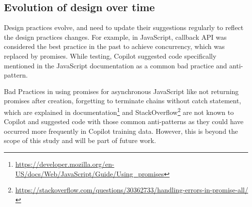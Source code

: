 \subsection{Evolution of design over time}
\label{evolution}
Design practices evolve, and \cct{} need to update their suggestions regularly to reflect the design practices changes. 
For example, in JavaScript, callback API was considered the best practice in the past to achieve concurrency, which was replaced by promises. 
While testing, Copilot suggested code specifically mentioned in the JavaScript documentation as a common bad practice and anti-pattern.

Bad Practices in using promises for asynchronous JavaScript like not returning promises after creation, forgetting to terminate chains without catch statement, which are explained in documentation\footnote{\label{docs}\url{https://developer.mozilla.org/en-US/docs/Web/JavaScript/Guide/Using_promises}} and StackOverflow\footnote{\url{https://stackoverflow.com/questions/30362733/handling-errors-in-promise-all/}} are not known to Copilot and suggested code with those common anti-patterns as they could have occurred more frequently in Copilot training data. 
However, this is beyond the scope of this study and will be part of future work.